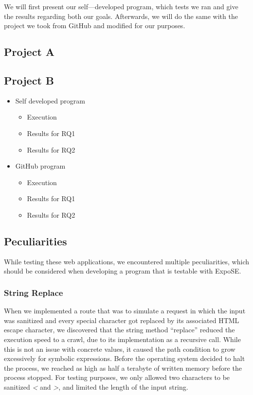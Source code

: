 We will first present our self—developed program, which tests we ran and give the results regarding both our goals. Afterwards, we will do the same with the project we took from GitHub and modified for our purposes.



\subsection{Project A}





\subsection{Project B}

\begin{itemize}
    \item Self developed program
    \begin{itemize}
        \item Execution
        \item Results for RQ1
        \item Results for RQ2
    \end{itemize}
    \item GitHub program
    \begin{itemize}
        \item Execution
        \item Results for RQ1
        \item Results for RQ2
    \end{itemize}
\end{itemize}

\subsection{Peculiarities}
\label{sec:peculiarities}
While testing these web applications, we encountered multiple peculiarities, which should be considered when developing a program that is testable with ExpoSE.

\subsubsection{String Replace}
When we implemented a route that was to simulate a request in which the input was sanitized and every special character got replaced by its associated HTML escape character, we discovered that the string method “replace” reduced the execution speed to a crawl, due to its implementation as a recursive call.
While this is not an issue with concrete values, it caused the path condition to grow excessively for symbolic expressions. Before the operating system decided to halt the process, we reached as high as half a terabyte of written memory before the process stopped. For testing purposes, we only allowed two
characters to be sanitized \textit{\textless} and \textit{\textgreater}, and limited the length of the input string. 


